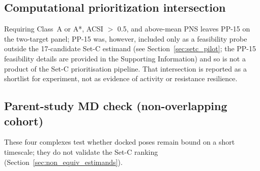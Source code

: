 \documentclass[journal=jcisd8,manuscript=article,layout=traditional]{achemso}
\begin{document}
\subsection{Computational prioritization intersection}

Requiring Class~A or A*, ACSI $>$ \num{0.5}, and above-mean PNS leaves PP-15 on the two-target panel; PP-15 was, however, included only as a feasibility probe outside the \num{17}-candidate Set-C estimand (see Section~\ref{sec:setc_pilot}; the PP-15 feasibility details are provided in the Supporting Information) and so is not a product of the Set-C prioritisation pipeline. That intersection is reported as a shortlist for experiment, not as evidence of activity or resistance resilience.

\subsection{Parent-study MD check (non-overlapping cohort)}

These four complexes test whether docked poses remain bound on a short timescale; they do not validate the Set-C ranking (Section~\ref{sec:non_equiv_estimands}).

\begin{table}[htbp]
\centering
\caption[MD stability metrics]{Production MD stability metrics for parent-study wild-type complexes (\qty{10}{\nano\second}). BB RMSD, ligand RMSD, minimum distance, contacts, and H-bonds are computed from PBC-unwrapped trajectories.}
\label{tab:md_stability}
\end{table}
\end{document}
